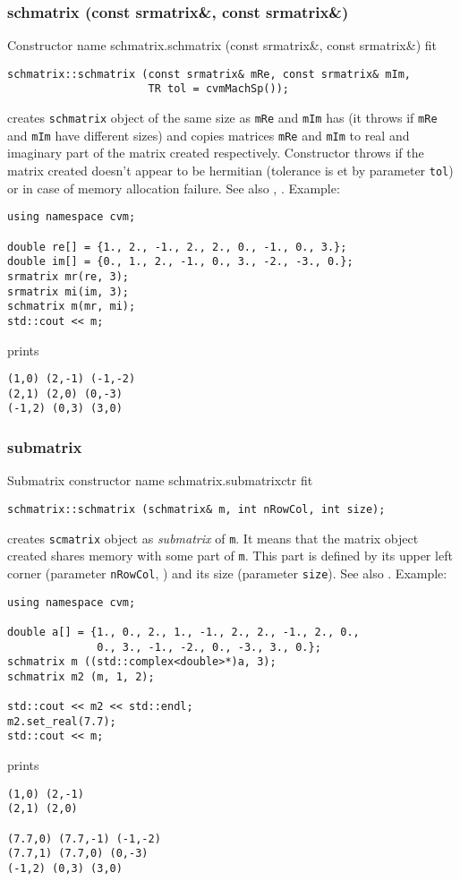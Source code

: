 \subsubsection{schmatrix (const srmatrix\&, const srmatrix\&)}
Constructor%
\pdfdest name {schmatrix.schmatrix (const srmatrix&, const srmatrix&)} fit
\begin{verbatim}
schmatrix::schmatrix (const srmatrix& mRe, const srmatrix& mIm,
                      TR tol = cvmMachSp());
\end{verbatim}
creates  \verb"schmatrix" object
of the same size as \verb"mRe" and \verb"mIm" has
(it throws 
if \verb"mRe" and
\verb"mIm" have different sizes)
and copies matrices \verb"mRe" and \verb"mIm"
to  real and imaginary part of the matrix created respectively.
Constructor throws  
if the matrix created doesn't appear to be hermitian (tolerance is et by parameter \verb'tol')
or in case of memory allocation failure.
See also , .
Example:
\begin{Verbatim}
using namespace cvm;

double re[] = {1., 2., -1., 2., 2., 0., -1., 0., 3.};
double im[] = {0., 1., 2., -1., 0., 3., -2., -3., 0.};
srmatrix mr(re, 3);
srmatrix mi(im, 3);
schmatrix m(mr, mi);
std::cout << m;
\end{Verbatim}
prints
\begin{Verbatim}
(1,0) (2,-1) (-1,-2)
(2,1) (2,0) (0,-3)
(-1,2) (0,3) (3,0)
\end{Verbatim}
\newpage



\subsubsection{submatrix}
Submatrix constructor%
\pdfdest name {schmatrix.submatrixctr} fit
\begin{verbatim}
schmatrix::schmatrix (schmatrix& m, int nRowCol, int size);
\end{verbatim}
creates  \verb"scmatrix" object as  \emph{submatrix} of \verb"m".
It means that the matrix object created shares  memory with some part
of \verb"m". This part is defined by its upper left corner (parameter 
\verb"nRowCol", \Based)
and its size (parameter \verb"size").
See also .
Example:
\begin{Verbatim}
using namespace cvm;

double a[] = {1., 0., 2., 1., -1., 2., 2., -1., 2., 0.,
              0., 3., -1., -2., 0., -3., 3., 0.};
schmatrix m ((std::complex<double>*)a, 3);
schmatrix m2 (m, 1, 2);

std::cout << m2 << std::endl;
m2.set_real(7.7);
std::cout << m;
\end{Verbatim}
prints
\begin{Verbatim}
(1,0) (2,-1)
(2,1) (2,0)

(7.7,0) (7.7,-1) (-1,-2)
(7.7,1) (7.7,0) (0,-3)
(-1,2) (0,3) (3,0)
\end{Verbatim}
\newpage




